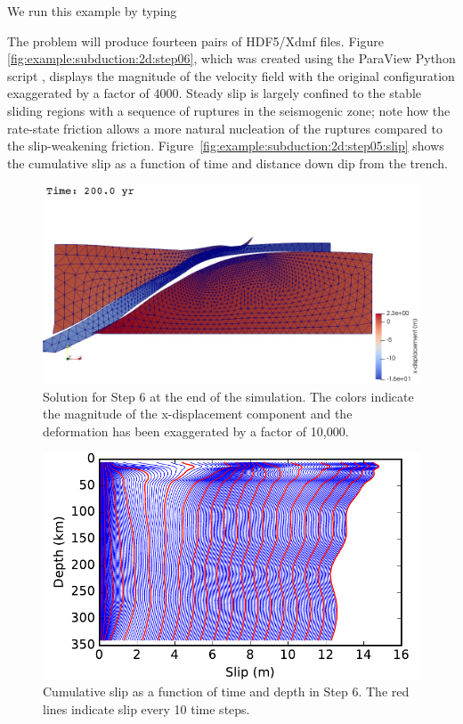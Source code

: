 We run this example by typing
The problem will produce fourteen pairs of HDF5/Xdmf files. Figure
\vref{fig:example:subduction:2d:step06}, which was created using the
ParaView Python script , displays the
magnitude of the velocity field with the original configuration
exaggerated by a factor of 4000. Steady slip is largely confined to
the stable sliding regions with a sequence of ruptures in the
seismogenic zone; note how the rate-state friction allows a more
natural nucleation of the ruptures compared to the slip-weakening
friction. Figure~\ref{fig:example:subduction:2d:step05:slip} shows the
cumulative slip as a function of time and distance down dip from the
trench.

\begin{figure}
  \includegraphics[width=4.5in]{examples/figs/subduction2d_step06_soln}
  \caption{Solution for Step 6 at the end of the simulation. The
    colors indicate the magnitude of the x-displacement component and
    the deformation has been exaggerated by a factor of 10,000.}
  \label{fig:example:subduction:2d:step06}
\end{figure}

\begin{figure}
  \includegraphics[width=4.5in]{examples/figs/subduction2d_step06_slip}
  \caption{Cumulative slip as a function of time and depth in Step
    6. The red lines indicate slip every 10 time steps.}
  \label{fig:example:subduction:2d:step06:slip}
\end{figure}



